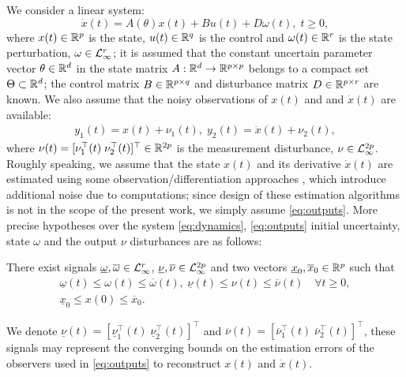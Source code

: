 \documentclass[letterpaper, 10 pt, conference]{ieeeconf}  %
\begin{document}
We consider a linear system: 
\begin{equation}
\dot{x}(t)=A(\theta)x(t)+Bu(t)+D\omega(t),\;t\geq0,\label{eq:dynamics}
\end{equation}
where $x(t)\in\mathbb{R}^{p}$ is the state, $u(t)\in\mathbb{R}^{q}$ is the
control and $\omega(t)\in\mathbb{R}^{r}$ is the state perturbation, $\omega\in\mathcal{L}_{\infty}^{r}$;
it is assumed that the constant uncertain parameter vector $\theta\in\mathbb{R}^{d}$
in the state matrix $A:\mathbb{R}^{d}\to\mathbb{R}^{p\times p}$ belongs to
a compact set $\Theta\subset\mathbb{R}^{d}$; the control matrix $B\in\mathbb{R}^{p\times q}$
and disturbance matrix $D\in\mathbb{R}^{p\times r}$ are known. We also
assume that the noisy observations of $x(t)$ and and $\dot{x}(t)$
are available:
\begin{gather}
y_{1}(t)=x(t)+\nu_{1}(t),\;y_{2}(t)=\dot{x}(t)+\nu_{2}(t),\label{eq:outputs}
\end{gather}
where $\nu(t)=[\nu_{1}^{\top}(t)\;\nu_{2}^{\top}(t)]^{\top}\in\mathbb{R}^{2p}$
is the measurement disturbance, $\nu\in\mathcal{L}_{\infty}^{2p}$. Roughly
speaking, we assume that the state $x(t)$ and its derivative $\dot{x}(t)$
are estimated using some observation/differentiation approaches \cite{Besancon2007,Reichhartinger2018},
which introduce additional noise due to computations; since design
of these estimation algorithms is not in the scope of the present
work, we simply assume \eqref{eq:outputs}. 
More precise hypotheses over the system \eqref{eq:dynamics}, \eqref{eq:outputs}
initial uncertainty, state $\omega$ and the output $\nu$ disturbances
are as follows:
\begin{assumption}
\label{assu:main} There exist signals $\underline{\omega},\overline{\omega}\in\mathcal{L}_{\infty}^{r}$,
$\underline{\nu},\overline{\nu}\in\mathcal{L}_{\infty}^{2p}$ and two vectors
$\underline{x}_{0},\overline{x}_{0}\in\mathbb{R}^{p}$ such that
\begin{gather*}
\underline{\omega}(t)\leq\omega(t)\leq\overline{\omega}(t),\;\underline{\nu}(t)\leq\nu(t)\leq\overline{\nu}(t)\quad\forall t\geq0,\\
\underline{x}_{0}\leq x(0)\leq\overline{x}_{0}.
\end{gather*}
\end{assumption}
We denote $\underline{\nu}(t)=[\underline{\nu}_{1}^{\top}(t)\;\underline{\nu}_{2}^{\top}(t)]^{\top}$
and $\overline{\nu}(t)=[\overline{\nu}_{1}^{\top}(t)\;\overline{\nu}_{2}^{\top}(t)]^{\top}$,
these signals may represent the converging bounds on the estimation
errors of the observers used in \eqref{eq:outputs} to reconstruct
$x(t)$ and $\dot{x}(t)$.
\end{document}
